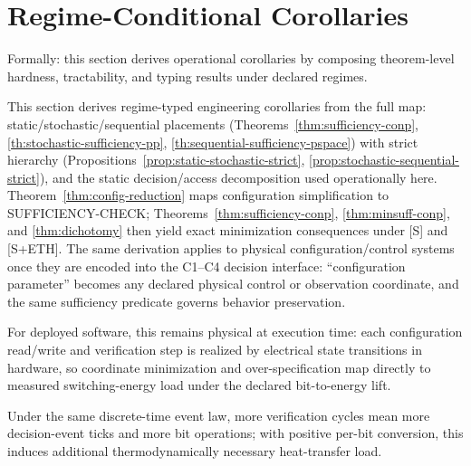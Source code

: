 \section{Regime-Conditional Corollaries}\label{sec:engineering-justification}

Formally: this section derives operational corollaries by composing theorem-level hardness, tractability, and typing results under declared regimes.

This section derives regime-typed engineering corollaries from the full map: static/stochastic/sequential placements (Theorems~\ref{thm:sufficiency-conp}, \ref{th:stochastic-sufficiency-pp}, \ref{th:sequential-sufficiency-pspace}) with strict hierarchy (Propositions~\ref{prop:static-stochastic-strict}, \ref{prop:stochastic-sequential-strict}), and the static decision/access decomposition used operationally here.
Theorem~\ref{thm:config-reduction} maps configuration simplification to SUFFICIENCY-CHECK; Theorems~\ref{thm:sufficiency-conp}, \ref{thm:minsuff-conp}, and \ref{thm:dichotomy} then yield exact minimization consequences under [S] and [S+ETH].
The same derivation applies to physical configuration/control systems once they are encoded into the C1--C4 decision interface: ``configuration parameter'' becomes any declared physical control or observation coordinate, and the same sufficiency predicate governs behavior preservation.

For deployed software, this remains physical at execution time: each configuration read/write and verification step is realized by electrical state transitions in hardware, so coordinate minimization and over-specification map directly to measured switching-energy load under the declared bit-to-energy lift.

Under the same discrete-time event law, more verification cycles mean more decision-event ticks and more bit operations; with positive per-bit conversion, this induces additional thermodynamically necessary heat-transfer load.

